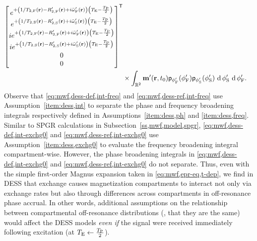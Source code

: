 \begin{align}
\begin{bmatrix}
				e^{+\paren{1/\tf{2}\pr-\Rtpf\pr+i\ompfmed\pr}\paren{\TE-\frac{\TP}{2}}} \\
				e^{+\paren{1/\ts{2}\pr-\Rtps\pr+i\ompsmed\pr}\paren{\TE-\frac{\TP}{2}}} \\
				ie^{+\paren{1/\tf{2}\pr-\Rtpf\pr+i\ompfmed\pr}\paren{\TE-\frac{\TP}{2}}} \\
				ie^{+\paren{1/\ts{2}\pr-\Rtps\pr+i\ompsmed\pr}\paren{\TE-\frac{\TP}{2}}} \\
				0 \\
				0
			\end{bmatrix}\tpose 
			\nonumber \\
		&\times \int_{\reals{2}} \bmmp\paren{\bmr,t_0}
			\dist{\phipf} \paren{\phipf} \dist{\phips} \paren{\phips} 
			\der{\phips} \der{\phipf}.
			\label{eq:mwf,dess-ref,int-exchg0}
\end{align}
Observe that
\eqref{eq:mwf,dess-def,int-freq} and \eqref{eq:mwf,dess-ref,int-freq}
use Assumption~\ref{item:dess,int}
to separate the phase and frequency broadening integrals
respectively defined 
in Assumptions~\ref{item:dess,ph} and \ref{item:dess,freq}.
Similar to SPGR calculations 
in Subsection~\ref{ss,mwf,model,spgr},
\eqref{eq:mwf,dess-def,int-exchg0} and \eqref{eq:mwf,dess-ref,int-exchg0}
use Assumption~\ref{item:dess,exchg0}
to evaluate the frequency broadening integral compartment-wise.
However,
the phase broadening integrals
in \eqref{eq:mwf,dess-def,int-exchg0} and \eqref{eq:mwf,dess-ref,int-exchg0}
do not separate.
Thus,
even with the simple first-order Magnus expansion
taken in \eqref{eq:mwf,epr-eq,t-dep},
we find in DESS 
that exchange causes magnetization compartments
to interact not only via exchange rates
but also through differences across compartments
in off-resonance phase accrual.
In other words,
additional assumptions on the relationship 
between compartmental off-resonance distributions
(\eg, that they are the same)
would affect the DESS models
\emph{even if} the signal were received
immediately following excitation (at $T_\mathrm{E} \gets \frac{T_\mathrm{P}}{2}$).

